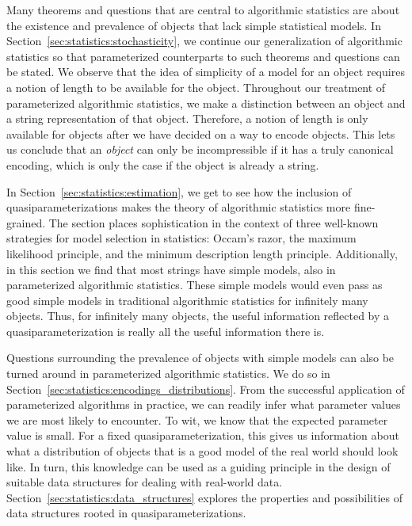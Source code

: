 Many theorems and questions that are central to algorithmic statistics are about the existence and prevalence of objects that lack simple statistical models.
In Section~\ref{sec:statistics:stochasticity}, we continue our generalization of algorithmic statistics so that parameterized counterparts to such theorems and questions can be stated.
We observe that the idea of simplicity of a model for an object requires a notion of length to be available for the object.
Throughout our treatment of parameterized algorithmic statistics, we make a distinction between an object and a string representation of that object.
Therefore, a notion of length is only available for objects after we have decided on a way to encode objects.
This lets us conclude that an \emph{object} can only be incompressible if it has a truly canonical encoding, which is only the case if the object is already a string.

In Section~\ref{sec:statistics:estimation}, we get to see how the inclusion of quasiparameterizations makes the theory of algorithmic statistics more fine-grained.
The section places sophistication in the context of three well-known strategies for model selection in statistics: Occam's razor, the maximum likelihood principle, and the minimum description length principle.
Additionally, in this section we find that most strings have simple models, also in parameterized algorithmic statistics.
These simple models would even pass as good simple models in traditional algorithmic statistics for infinitely many objects.
Thus, for infinitely many objects, the useful information reflected by a quasiparameterization is really all the useful information there is.

Questions surrounding the prevalence of objects with simple models can also be turned around in parameterized algorithmic statistics.
We do so in Section~\ref{sec:statistics:encodings_distributions}.
From the successful application of parameterized algorithms in practice, we can readily infer what parameter values we are most likely to encounter.
To wit, we know that the expected parameter value is small.
For a fixed quasiparameterization, this gives us information about what a distribution of objects that is a good model of the real world should look like.
In turn, this knowledge can be used as a guiding principle in the design of suitable data structures for dealing with real-world data.
Section~\ref{sec:statistics:data_structures} explores the properties and possibilities of data structures rooted in quasiparameterizations.

